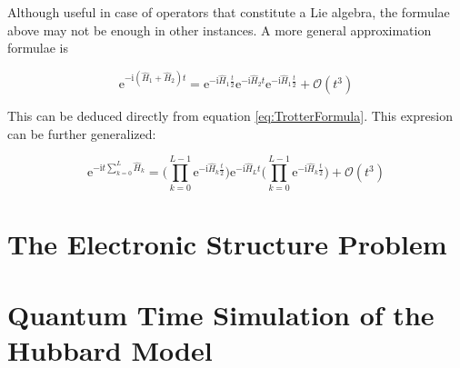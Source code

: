   Although useful in case of operators that constitute a Lie algebra, the formulae above may not be enough in other instances. A more general approximation formulae is

  \begin{equation}
    \mathrm{e}^{-\mathrm{i}(\hat{H}_1 + \hat{H}_2)t} = \mathrm{e}^{-\mathrm{i}\hat{H}_1\frac{t}{2}}\mathrm{e}^{-\mathrm{i}\hat{H}_2t}\mathrm{e}^{-\mathrm{i}\hat{H}_1\frac{t}{2}} + \mathcal{O}(t^3) 
    \label{eq:qubicorder}
  \end{equation}

  This can be deduced directly from equation \ref{eq:TrotterFormula}. This expresion can be further generalized:

  \begin{equation}
    \mathrm{e}^{-\mathrm{i}t\sum_{k = 0}^{L}\hat{H}_k} = \Bigg(\prod_{k = 0}^{L-1}\mathrm{e}^{-\mathrm{i}\hat{H}_k\frac{t}{2}}\Bigg)\mathrm{e}^{-\mathrm{i}\hat{H}_Lt}\Bigg(\prod_{k = 0}^{L-1}\mathrm{e}^{-\mathrm{i}\hat{H}_k\frac{t}{2}}\Bigg) + \mathcal{O}(t^3)
    \label{eq:Suzuki0}
  \end{equation}

  
\section{The Electronic Structure Problem}
  \lipsum[2-4]

\section{Quantum Time Simulation of the Hubbard Model}
  \lipsum[2-4]

